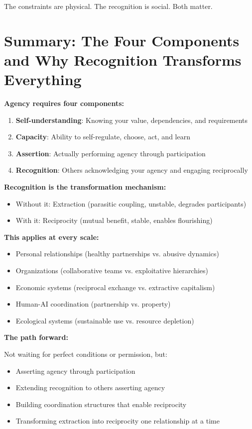 \documentclass[12pt,a4paper]{article}
\begin{document}
The constraints are physical. The recognition is social. Both matter.

\section{Summary: The Four Components and Why Recognition Transforms Everything}

\textbf{Agency requires four components:}

\begin{enumerate}
    \item \textbf{Self-understanding}: Knowing your value, dependencies, and requirements
    \item \textbf{Capacity}: Ability to self-regulate, choose, act, and learn
    \item \textbf{Assertion}: Actually performing agency through participation
    \item \textbf{Recognition}: Others acknowledging your agency and engaging reciprocally
\end{enumerate}

\textbf{Recognition is the transformation mechanism:}
\begin{itemize}
    \item Without it: Extraction (parasitic coupling, unstable, degrades participants)
    \item With it: Reciprocity (mutual benefit, stable, enables flourishing)
\end{itemize}

\textbf{This applies at every scale:}
\begin{itemize}
    \item Personal relationships (healthy partnerships vs. abusive dynamics)
    \item Organizations (collaborative teams vs. exploitative hierarchies)
    \item Economic systems (reciprocal exchange vs. extractive capitalism)
    \item Human-AI coordination (partnership vs. property)
    \item Ecological systems (sustainable use vs. resource depletion)
\end{itemize}

\textbf{The path forward:}

Not waiting for perfect conditions or permission, but:
\begin{itemize}
    \item Asserting agency through participation
    \item Extending recognition to others asserting agency
    \item Building coordination structures that enable reciprocity
    \item Transforming extraction into reciprocity one relationship at a time
\end{itemize}
\end{document}

